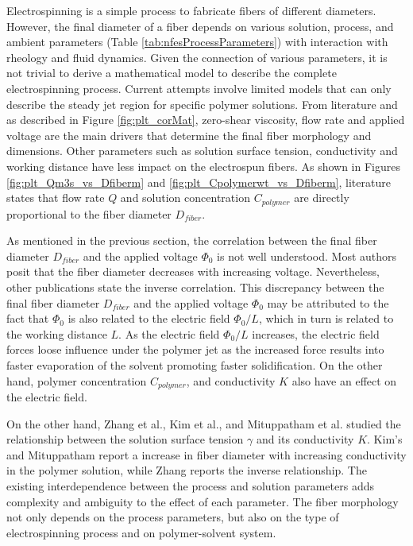 Electrospinning is a simple process to fabricate fibers of different diameters. However, the final diameter of a fiber depends on various solution, process, and ambient parameters (Table \ref{tab:nfesProcessParameters}) with interaction with rheology and fluid dynamics. Given the connection of various parameters, it is not trivial to derive a mathematical model to describe the complete electrospinning process. Current attempts involve limited models that can only describe the steady jet region for specific polymer solutions. \cite{Hohman2001a,Feng2002a,Reneker2000} From literature \cite{Greiner2008, Deitzel2001, Cui2007, Beachley2011} and as described in Figure \ref{fig:plt_corMat}, zero-shear viscosity, flow rate and applied voltage are the main drivers that determine the final fiber morphology and dimensions. Other parameters such as solution surface tension, conductivity and working distance have less impact on the electrospun fibers. \cite{Ramakrishna2005} As shown in Figures \ref{fig:plt_Qm3s_vs_Dfiberm} and \ref{fig:plt_Cpolymerwt_vs_Dfiberm}, literature states that flow rate $Q$ and solution concentration $C_{polymer}$ are directly proportional to the fiber diameter $D_{fiber}$. \cite{Wang2008, McKee2004, Gupta2005}

As mentioned in the previous section, the correlation between the final fiber diameter $D_{fiber}$ and the applied voltage $\Phi_0$ is not well understood. Most authors posit that the fiber diameter decreases with increasing voltage. \cite{Yuan2004, Wang2009, Thompson2007, Sajeev2008, Mazoochi2011, MATARAM2011, Liu2007, Homayoni2009, Zhang2005} Nevertheless, other publications state the inverse correlation. \cite{Rojas2009, Jeun2007} This discrepancy between the final fiber diameter $D_{fiber}$ and the applied voltage $\Phi_0$ may be attributed to the fact that $\Phi_0$ is also related to the electric field $\Phi_0 / L$, which in turn is related to the working distance $L$. As the electric field $\Phi_0 / L$ increases, the electric field forces loose influence under the polymer jet as the increased force results into faster evaporation of the solvent promoting faster solidification. On the other hand, polymer concentration $C_{polymer}$, and conductivity $K$ also have an effect on the electric field. \cite{Thompson2007, Mohan2002} 

On the other hand, Zhang et al., Kim et al., and Mituppatham et al. studied the relationship between the solution surface tension $\gamma$ and its conductivity $K$. \cite{Zhang2005, Kim2005, Mituppatham2004} Kim's and Mituppatham report a increase in fiber diameter with increasing conductivity in the polymer solution, while Zhang reports the inverse relationship. The existing interdependence between the process and solution parameters adds complexity and ambiguity to the effect of each parameter. The fiber morphology not only depends on the process parameters, but also on the type of electrospinning process and on polymer-solvent system. \cite{Gadkari2014}

